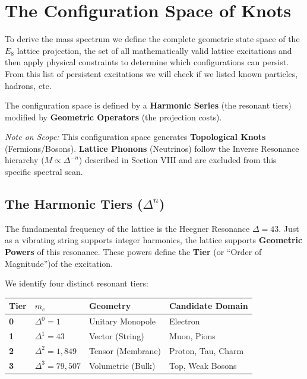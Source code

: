 \section*{The Configuration Space of Knots}

To derive the mass spectrum we define the complete geometric state space of the $E_8$ lattice projection, the set of all mathematically valid lattice excitations and then apply physical constraints to determine which configurations can persist. From this list of persistent excitations we will check if we listed known particles, hadrons, etc.

The configuration space is defined by a \textbf{Harmonic Series} (the resonant tiers) modified by \textbf{Geometric Operators} (the projection costs).

\textit{Note on Scope:} This configuration space generates \textbf{Topological Knots} (Fermions/Bosons). \textbf{Lattice Phonons} (Neutrinos) follow the Inverse Resonance hierarchy ($M \propto \Delta^{-n}$) described in Section VIII and are excluded from this specific spectral scan.

\subsection*{The Harmonic Tiers (\texorpdfstring{$\Delta^n$}{Deltapown})}

The fundamental frequency of the lattice is the Heegner Resonance $\Delta = 43$. Just as a vibrating string supports integer harmonics, the lattice supports \textbf{Geometric Powers} of this resonance. These powers define the \textbf{Tier} (or ``Order of Magnitude'')of the excitation.

We identify four distinct resonant tiers:

\begin{table}[h]
\centering
\begin{tabular}{llll}
\toprule
\textbf{Tier} & \textbf{$m_e$} & \textbf{Geometry} & \textbf{Candidate Domain} \\ \midrule
\textbf{0} & $\Delta^0 = 1$ & Unitary Monopole & Electron \\
\textbf{1} & $\Delta^1 = 43$ & Vector (String) & Muon, Pions \\
\textbf{2} & $\Delta^2 = 1,849$ & Tensor (Membrane) & Proton, Tau, Charm \\
\textbf{3} & $\Delta^3 = 79,507$ & Volumetric (Bulk) & Top, Weak Bosons \\ \bottomrule
\end{tabular}
\end{table}

